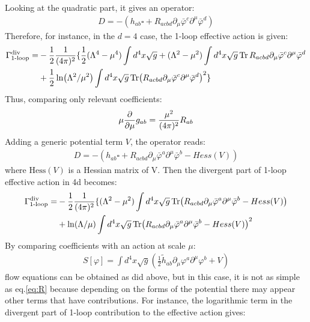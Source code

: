 Looking at the quadratic part, it gives an operator:
\begin{align}
    D = -(h_{ab} \square + R_{acbd} \partial _{\mu} \bar{\varphi}^{c} \partial ^{\mu} \bar{\varphi}^{d} )
\end{align}
Therefore, for instance, in the $d=4$ case, the 1-loop effective action is given:
\begin{align}
    \begin{split}
    \Gamma _{\text{1-loop}} ^{\text{div}} = &-\frac{1}{2} \frac{1}{(4\pi)^2}\lbrace \frac{1}{2}(\Lambda^4 - \mu ^{4}) \int d^{4}x \sqrt{g} + (\Lambda ^{2} - \mu ^{2}) \int d^{4}x \sqrt{g} \Tr R_{acbd} \partial _{\mu} \bar{\varphi}^{c} \partial ^{\mu} \bar{\varphi}^{d} \\ 
    &+ \frac{1}{2} \ln (\Lambda ^{2} / \mu ^{2})\int d^{4}x  \sqrt{g} \Tr (R_{acbd} \partial _{\mu} \bar{\varphi}^{c} \partial ^{\mu} \bar{\varphi}^{d}) ^{2} \rbrace
    \end{split}
\end{align}
Thus, comparing only relevant coefficients:
\begin{align}
    \label{eq:R}
    \mu \pdv{\mu} g_{ab} = \frac{\mu ^{2}} {(4\pi)^2} R_{ab}
\end{align}
Adding a generic potential term $V$, the operator reads:
\begin{align}
    D = -(h_{ab}\square + R_{acbd} \partial_{\mu} \bar{\varphi} ^{a} \partial^{\mu} \bar{\varphi} ^{b} - Hess (V))
\end{align}
where $\text{Hess}(V)$ is a Hessian matrix of V. Then the divergent part of 1-loop effective action in 4d becomes:
\begin{align}
    \begin{split}
    \Gamma_{\text{1-loop}}^{\text{div}} = &-\frac{1}{2} \frac{1}{(4\pi)^{2}}\lbrace (\Lambda ^{2} - \mu ^{2})\int d^{4}x \sqrt{g} \Tr (R_{acbd} \partial_{\mu} \bar{\varphi} ^{a} \partial^{\mu} \bar{\varphi} ^{b} - Hess (V)) \\ 
    &+ \ln (\Lambda/\mu)\int d^{4}x \sqrt{g} \Tr(R_{acbd} \partial_{\mu} \bar{\varphi} ^{a} \partial^{\mu} \bar{\varphi} ^{b} - Hess (V))^{2}
    \end{split}
\end{align}
By comparing coefficients with an action at scale $\mu$:
\begin{align}
    S[\varphi] = \int d^{4}x \sqrt{g} (\frac{1}{2} \tilde h_{ab} \partial _{\mu} \varphi^{a} \partial ^{\mu} \varphi ^{b} + V)
\end{align}
flow equations can be obtained as did above, but in this case, it is not as simple as eq.\ref{eq:R} because depending on the forms of the potential there may appear other terms that have contributions. For instance, the logarithmic term in the divergent part of 1-loop contribution to the effective action gives:
